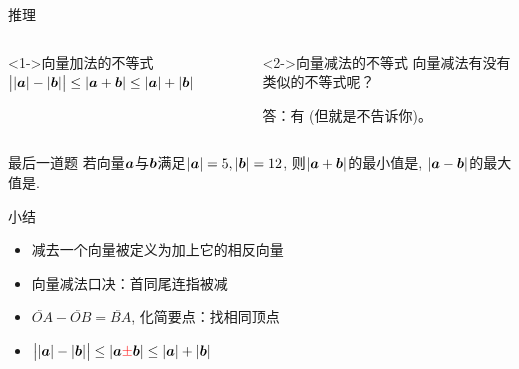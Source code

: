\documentclass[mathserif,blue]{beamer}
\begin{document}
\begin{frame}{推理}
\kaishu
  \begin{columns}
  \begin{column}{0.45\textwidth}
    \begin{block}<1->{向量加法的不等式}
      $\big||\bm a|-|\bm b|\big| \le |\bm a + \bm b| \le |\bm a|+|\bm b|$
    \end{block}
  \end{column}
  \begin{column}{0.55\textwidth}
    \begin{block}<2->{向量减法的不等式}
     向量减法有没有类似的不等式呢？\par\pause
     答：有 (但就是不告诉你)。
    \end{block}
  \end{column}
  \end{columns}
\end{frame}

\begin{frame}{最后一道题}
  若向量$\bm a$与$\bm b$满足$|\bm a|=5, |\bm b|=12$, 则$|\bm a+\bm b|$的最小值是\lines, $|\bm a-\bm b|$的最大值是\lines.
\end{frame}

\begin{frame}{小结}
\begin{itemize}[<+->]\pause
  \item 减去一个向量被定义为加上它的相反向量
  \item 向量减法口决：首同尾连指被减
  \item $\lvec{OA}-\lvec{OB}=\lvec{BA}$, 化简要点：找相同顶点
  \item $\big||\bm a|-|\bm b|\big| \le |\bm a\textcolor{red}{\pm}\bm b| \le |\bm a|+|\bm b|$
\end{itemize}
\end{frame}
\end{document}

